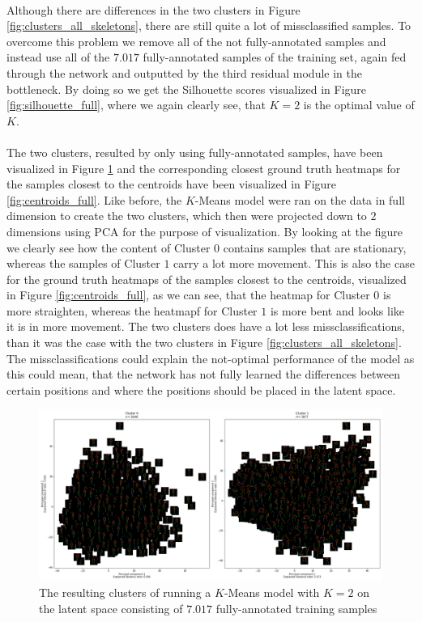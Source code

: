 \documentclass[./main.tex]{subfiles}
\begin{document}
\\
Although there are differences in the two clusters in Figure \ref{fig:clusters_all_skeletons}, there are still quite a lot of missclassified samples. To overcome this problem we remove all of the not fully-annotated samples and instead use all of the $7.017$ fully-annotated samples of the training set, again fed through the network and outputted by the third residual module in the bottleneck. By doing so we get the Silhouette scores visualized in Figure \ref{fig:silhouette_full}, where we again clearly see, that $K = 2$ is the optimal value of $K$.
\\
\\
The two clusters, resulted by only using fully-annotated samples, have been visualized in Figure \ref{fig:clusters_full_skeletons} and the corresponding closest ground truth heatmaps for the samples closest to the centroids have been visualized in Figure \ref{fig:centroids_full}. Like before, the $K$-Means model were ran on the data in full dimension to create the two clusters, which then were projected down to $2$ dimensions using PCA for the purpose of visualization. By looking at the figure we clearly see how the content of Cluster $0$ contains samples that are stationary, whereas the samples of Cluster $1$ carry a lot more movement. This is also the case for the ground truth heatmaps of the samples closest to the centroids, visualized in Figure \ref{fig:centroids_full}, as we can see, that the heatmap for Cluster $0$ is more straighten, whereas the heatmapf for Cluster $1$ is more bent and looks like it is in more movement. The two clusters does have a lot less missclassifications, than it was the case with the two clusters in Figure \ref{fig:clusters_all_skeletons}. The missclassifications could explain the not-optimal performance of the model as this could mean, that the network has not fully learned the differences between certain positions and where the positions should be placed in the latent space.
\begin{figure}[htbp]
    \centering
    \includegraphics[width = \textwidth]{entities/cluster_full_skeletons.png}
    \caption{The resulting clusters of running a $K$-Means model with $K = 2$ on the latent space consisting of $7.017$ fully-annotated training samples}
    \label{fig:clusters_full_skeletons}
\end{figure}
\end{document}
